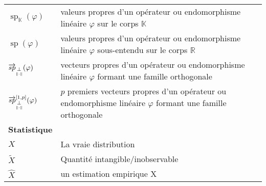 \begin{table}[H]
\begin{tabularx}{\textwidth}{lX}
		\midrule
		$\operatorname{sp}_{\mathds K}(\varphi)$                         & valeurs propres d'un opérateur ou endomorphisme linéaire $\varphi$ sur le corps $\mathds K$                                                                                                                                       \\
		$\operatorname{sp}(\varphi)$                                     & valeurs propres d'un opérateur ou endomorphisme linéaire $\varphi$ sous-entendu sur le corps $\mathds R$                                                                                                                          \\
		$\overrightarrow{sp}_{\underset{\Vert \cdot \Vert}{\perp}}(\varphi)$                    & vecteurs propres d'un opérateur ou endomorphisme linéaire $\varphi$ formant une famille orthogonale                                                                                                                               \\
		$\overrightarrow{sp}_{\underset{\Vert \cdot \Vert}{\perp}}^{[1,p]}(\varphi)$            & $p$ premiers vecteurs propres d'un opérateur ou endomorphisme linéaire $\varphi$ formant une famille orthogonale                                                                                                                  \\
		\midrule
		\textbf{Statistique}                                             &                                                                                                                                                                                                                                   \\
		\midrule
		$X$                                                              & La \og vraie \fg distribution                                                                                                                                                                                                     \\
		$\widetilde{X}$                                                  & Quantité intangible/inobservable                                                                                                                                                                                                  \\
		$\widehat{X}$                                                    & un estimation empirique X                                                                                                                                                                                                         \\

\end{tabularx}
\end{table}
